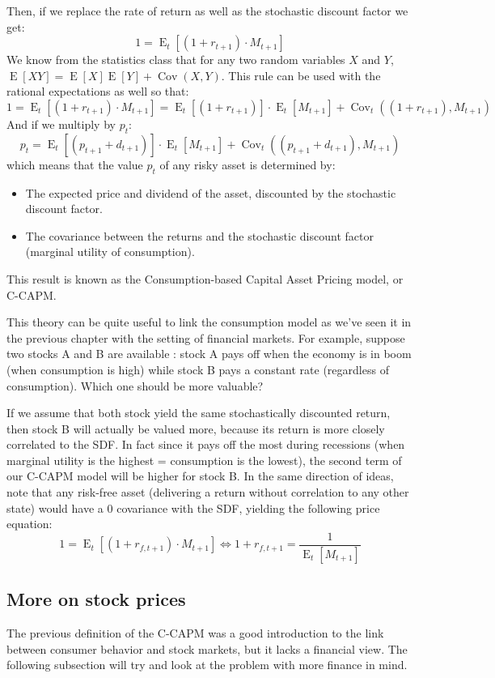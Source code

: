 \documentclass[12pt]{report}
\newcommand{\E}[1]{\operatorname{E}\left[#1\right]}
\newcommand{\Et}[1]{\operatorname{E}_t\left[#1\right]}
\newcommand{\cov}[1]{\operatorname{Cov}\left(#1\right)}
\newcommand{\covt}[1]{\operatorname{Cov}_t\left(#1\right)}
\begin{document}
Then, if we replace the rate of return as well as the stochastic discount factor we get: $$ 1 = \Et{(1+r_{t+1})\cdot M_{t+1}} $$ We know from the statistics class that for any two random variables $X$ and $Y$, $\E{XY} = \E{X}\E{Y} + \cov{X, Y}$. This rule can be used with the rational expectations as well so that: $$1 = \Et{(1+r_{t+1})\cdot M_{t+1}} = \Et{(1+r_{t+1})}\cdot\Et{M_{t+1}} + \covt{(1+r_{t+1}), M_{t+1}}$$ And if we multiply by $p_t$: $$ p_t = \Et{(p_{t+1}+d_{t+1})}\cdot\Et{M_{t+1}} + \covt{(p_{t+1}+d_{t+1}), M_{t+1}}$$ which means that the value $p_t$ of any risky asset is determined by:\begin{itemize}
\item The expected price and dividend of the asset, discounted by the stochastic discount factor.
\item The covariance between the returns and the stochastic discount factor (marginal utility of consumption).
\end{itemize}
This result is known as the Consumption-based Capital Asset Pricing model, or C-CAPM.

This theory can be quite useful to link the consumption model as we've seen it in the previous chapter with the setting of financial markets. For example, suppose two stocks A and B are available : stock A pays off when the economy is in boom (when consumption is high) while stock B pays a constant rate (regardless of consumption). Which one should be more valuable?

If we assume that both stock yield the same stochastically discounted return, then stock B will actually be valued more, because its return is more closely correlated to the SDF. In fact since it pays off the most during recessions (when marginal utility is the highest = consumption is the lowest), the second term of our C-CAPM model will be higher for stock B. In the same direction of ideas, note that any risk-free asset (delivering a return without correlation to any other state) would have a 0 covariance with the SDF, yielding the following price equation: $$ 1 = \Et{(1+r_{f, t+1})\cdot M_{t+1}} \Leftrightarrow 1+r_{f, t+1} =\frac{1}{\Et{M_{t+1}}} $$

\subsection{More on stock prices}

The previous definition of the C-CAPM was a good introduction to the link between consumer behavior and stock markets, but it lacks a financial view. The following subsection will try and look at the problem with more finance in mind.
\end{document}
